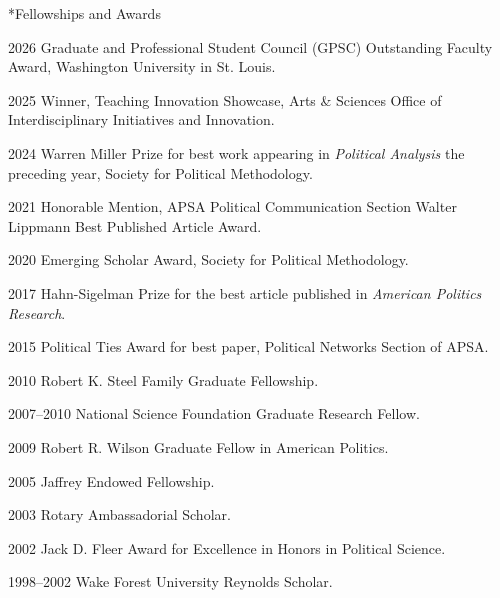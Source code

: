 \documentclass[10pt]{article}
\makeatletter
\renewcommand{\section}{\@startsection{section}{12}
{0mm}
{1.5\baselineskip}
{0.7\baselineskip}
{\large\bfseries\scshape\color{washu}\hrule\vspace{0.8\baselineskip}}}
\renewenvironment{CV}
  {\begin{list}{}
    {\renewcommand{\makelabel}{\entrylabel}
    \setlength{\labelwidth}{55pt}
    \setlength{\leftmargin}{62pt}
  }}
  {\end{list}}
\makeatother
\begin{document}
\section*{Fellowships and Awards}
\begin{CV}

\item[2026] Graduate and Professional Student Council (GPSC) Outstanding Faculty Award, Washington University in St. Louis.

\item[2025] Winner, Teaching Innovation Showcase, Arts \& Sciences Office of Interdisciplinary Initiatives and Innovation.

\item[2024] Warren Miller Prize for best work appearing in \emph{Political Analysis} the preceding year, Society for Political Methodology.

\item[2021] Honorable Mention, APSA Political Communication Section Walter Lippmann Best Published Article Award.

\item[2020] Emerging Scholar Award, Society for Political Methodology.

\item[2017] Hahn-Sigelman Prize for the best article published in \emph{American Politics Research}.

\item[2015] Political Ties Award for best paper, Political Networks Section of APSA.

\item[2010] Robert K. Steel Family Graduate Fellowship.

\item[2007--2010] National Science Foundation Graduate Research Fellow.

\item[2009] Robert R. Wilson Graduate Fellow in American Politics.

\item[2005] Jaffrey Endowed Fellowship.

\item[2003] Rotary Ambassadorial Scholar.

\item[2002] Jack D. Fleer Award for Excellence in Honors in Political Science.

\item[1998--2002] Wake Forest University Reynolds Scholar.

\end{CV}
\end{document}
